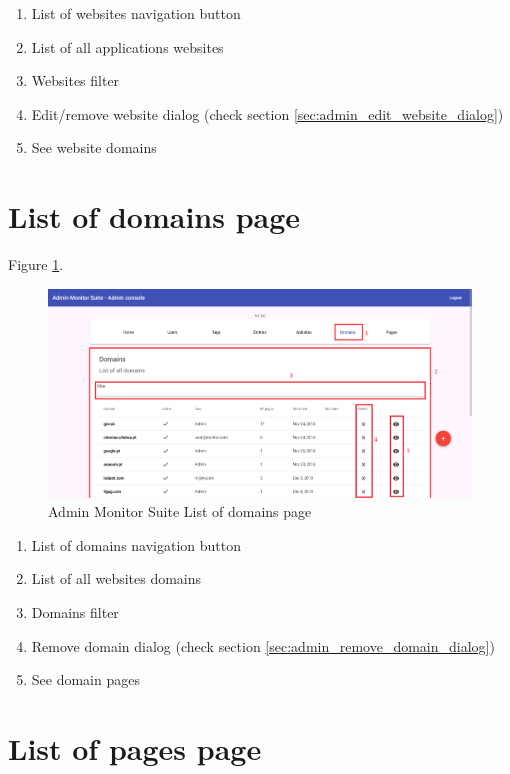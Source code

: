 \begin{enumerate}
    \item List of websites navigation button
    \item List of all applications websites
    \item Websites filter
    \item Edit/remove website dialog (check section \ref{sec:admin_edit_website_dialog})
    \item See website domains
\end{enumerate}

\clearpage

\section{List of domains page}

Figure \ref{fig:admin_list_domains_page}.

\begin{figure}[H]
    \centering
    \includegraphics[width=\linewidth]{lib/images/admin/admin_list_domains_page.png}
    \caption{Admin Monitor Suite List of domains page}
    \label{fig:admin_list_domains_page}
\end{figure}

\begin{enumerate}
    \item List of domains navigation button
    \item List of all websites domains
    \item Domains filter
    \item Remove domain dialog (check section \ref{sec:admin_remove_domain_dialog})
    \item See domain pages
\end{enumerate}

\clearpage

\section{List of pages page}

